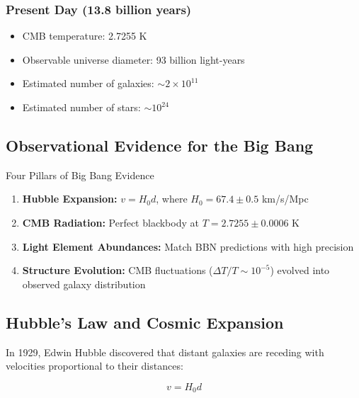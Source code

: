 \documentclass[11pt,a4paper]{article}
\begin{document}
\subsubsection{Present Day (13.8 billion years)}

\begin{itemize}[noitemsep]
    \item CMB temperature: 2.7255 K
    \item Observable universe diameter: 93 billion light-years
    \item Estimated number of galaxies: $\sim 2 \times 10^{11}$
    \item Estimated number of stars: $\sim 10^{24}$
\end{itemize}

\subsection{Observational Evidence for the Big Bang}

\begin{conceptbox}{Four Pillars of Big Bang Evidence}
\begin{enumerate}[noitemsep]
    \item \textbf{Hubble Expansion:} $v = H_0 d$, where $H_0 = 67.4 \pm 0.5$ km/s/Mpc
    \item \textbf{CMB Radiation:} Perfect blackbody at $T = 2.7255 \pm 0.0006$ K
    \item \textbf{Light Element Abundances:} Match BBN predictions with high precision
    \item \textbf{Structure Evolution:} CMB fluctuations ($\Delta T/T \sim 10^{-5}$) evolved into observed galaxy distribution
\end{enumerate}
\end{conceptbox}

\subsection{Hubble's Law and Cosmic Expansion}

In 1929, Edwin Hubble discovered that distant galaxies are receding with velocities proportional to their distances:

\begin{equationbox}
\begin{equation}
v = H_0 d
\label{eq:hubble}
\end{equation}
\end{equationbox}
\end{document}
